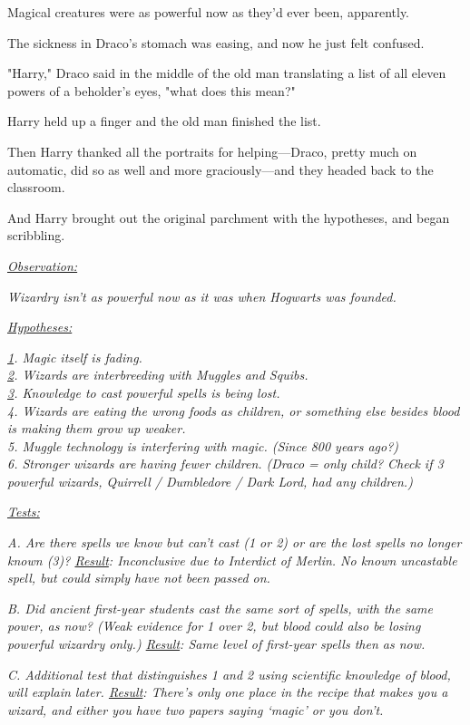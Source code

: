 Magical creatures were as powerful now as they'd ever been, apparently.

The sickness in Draco's stomach was easing, and now he just felt confused.

"Harry," Draco said in the middle of the old man translating a list of all 
eleven powers of a beholder's eyes, "what does this mean?"

Harry held up a finger and the old man finished the list.

Then Harry thanked all the portraits for helping---Draco, pretty much on 
automatic, did so as well and more graciously---and they headed back to the 
classroom.

And Harry brought out the original parchment with the hypotheses, and began 
scribbling.

\emph{\underline{Observation:}}

\emph{Wizardry isn't as powerful now as it was when Hogwarts was founded.}

\emph{\underline{Hypotheses:}}

\emph{\underline{1}. Magic itself is fading.\\
\underline{2}. Wizards are interbreeding with Muggles and Squibs.\\
\underline{3}. Knowledge to cast powerful spells is being lost.\\
4. Wizards are eating the wrong foods as children, or something else besides 
blood is making them grow up weaker.\\
5. Muggle technology is interfering with magic. (Since 800 years ago?)\\
6. Stronger wizards are having fewer children. (Draco = only child? Check if 3 
powerful wizards, Quirrell / Dumbledore / Dark Lord, had any children.)}

\emph{\underline{Tests:}}

\emph{A. Are there spells we know but can't cast (1 or 2) or are the lost 
spells no longer known (3)? \underline{Result}: Inconclusive due to Interdict 
of Merlin. No known uncastable spell, but could simply have not been passed on.}

\emph{B. Did ancient first-year students cast the same sort of spells, with the 
same power, as now? (Weak evidence for 1 over 2, but blood could also be losing 
powerful wizardry only.) \underline{Result}: Same level of first-year spells 
then as now.}

\emph{C. Additional test that distinguishes 1 and 2 using scientific knowledge 
of blood, will explain later. \underline{Result}: There's only one place in the 
recipe that makes you a wizard, and either you have two papers saying `magic' 
or you don't.}

